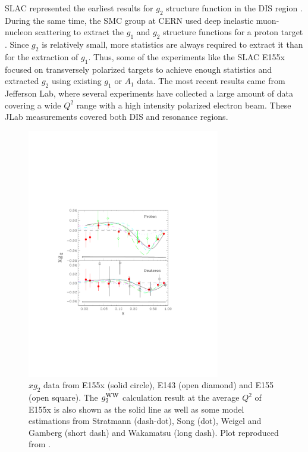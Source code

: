 SLAC represented the earliest results for $g_2$ structure function in the DIS region \cite{Anthony1996}. During the same time, the SMC group at CERN used deep inelastic muon-nucleon scattering to extract the $g_1$ and $g_2$ structure functions for a proton target \cite{Adams1997}. Since $g_2$ is relatively small, more statistics are always required to extract it than for the extraction of $g_1$. Thus, some of the experiments like the SLAC E155x \cite{Anthony2003} focused on transversely polarized targets to achieve enough statistics and extracted $g_2$ using existing $g_1$ or $A_1$ data. The most recent results came from Jefferson Lab, where several experiments have collected a large amount of data covering a wide $Q^2$ range with a high intensity polarized electron beam. These JLab measurements covered both DIS and resonance regions.

\begin{figure}[b!]
  \centering
  \includegraphics[width=0.75\textwidth]{figs/xg2p_E155x.pdf}
  \caption[$xg_2$ data from SLAC E155x, E143 and E155.]{$xg_2$ data from E155x \cite{Anthony2003} (solid circle), E143 \cite{Abe1998} (open diamond) and E155 \cite{Anthony2003} (open square). The $g_2^{\mathrm{WW}}$ calculation result at the average $Q^2$ of E155x is also shown as the solid line as well as some model estimations from Stratmann \cite{Stratmann1993} (dash-dot), Song \cite{Song1996} (dot), Weigel and Gamberg \cite{Weigel2001} (short dash) and Wakamatsu \cite{Wakamatsu2000} (long dash). Plot reproduced from \cite{Anthony2003}. \label{C4S1F1}}
\end{figure}

